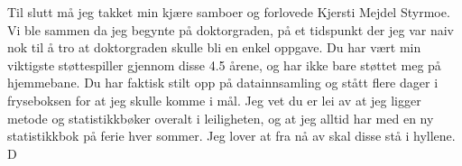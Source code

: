 Til slutt må jeg takket min kjære samboer og forlovede Kjersti Mejdel Styrmoe. Vi ble sammen da jeg begynte på doktorgraden, på et tidspunkt der jeg var naiv nok til å tro at doktorgraden skulle bli en enkel oppgave. Du har vært min viktigste støttespiller gjennom disse 4.5 årene, og har ikke bare støttet meg på hjemmebane. Du har faktisk stilt opp på datainnsamling og stått flere dager i fryseboksen for at jeg skulle komme i mål. Jeg vet du er lei av at jeg ligger metode og statistikkbøker overalt i leiligheten, og at jeg alltid har med en ny statistikkbok på ferie hver sommer. Jeg lover at fra nå av skal disse stå i hyllene. D

